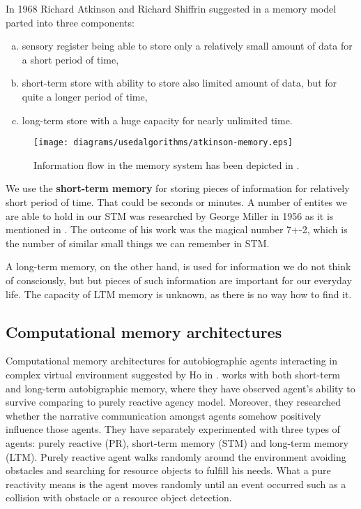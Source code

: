 In 1968 Richard Atkinson and Richard Shiffrin suggested in \cite{Atkinson:humanmemory} a memory model parted into three components: 

\begin{enumerate}[(a)]
\item sensory register being able to store only a relatively small amount of data for a short period of time,
\item short-term store with ability to store also limited amount of data, but for quite a longer period of time,
\item long-term store with a huge capacity for nearly unlimited time.
\end{enumerate}

\begin{figure}
  \centering                                
  \texttt{[image: diagrams/usedalgorithms/atkinson-memory.eps]}    
  \caption{Information flow in the memory system has been depicted in \cite{Atkinson:controlofrtm}.}
  \label{usedalgorithms:qttv}
\end{figure}

We use the {\bf short-term memory} for storing pieces of information for relatively short period of time. That could be seconds or minutes. A number of entites we are able to hold in our STM was researched by George Miller in 1956 as it is mentioned in \cite{Sternberg:congitivepsychology}. The outcome of his work was the magical number 7+-2, which is the number of similar small things we can remember in STM.

A long-term memory, on the other hand, is used for information we do not think of consciously, but but pieces of such information are important for our everyday life. The capacity of LTM memory is unknown, as there is no way how to find it. 
                                               
\subsection{Computational memory architectures}

Computational memory architectures for autobiographic agents interacting in complex virtual environment suggested by Ho in \cite{Ho:memoryarchitectures}. works with both short-term and long-term autobigraphic memory, where they have observed agent’s ability to survive comparing to purely reactive agency model. Moreover, they researched whether the narrative communication amongst agents somehow positively influence those agents. They have separately experimented with three types of agents: purely reactive (PR), short-term memory (STM) and long-term memory (LTM). Purely reactive agent walks randomly around the environment avoiding obstacles and searching for resource objects to fulfill his needs. What a pure reactivity means is the agent moves randomly until an event occurred such as a collision with obstacle or a resource object detection.

